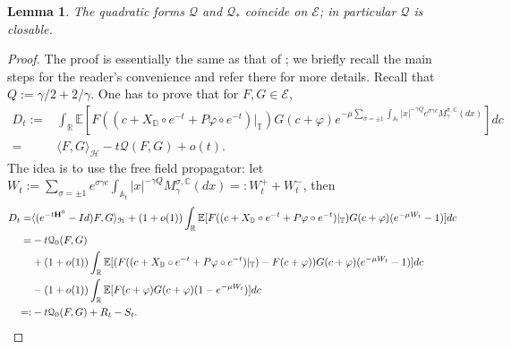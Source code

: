 \documentclass[11pt]{amsart}
\numberwithin{equation}{section}
\newtheorem{lemma}[theorem]{Lemma}
\theoremstyle{definition}
\newcommand{\C}{\mathbb{C}}
\newcommand{\A}{\mathbb{A}}
\newcommand{\R}{\mathbb{R}}
\newcommand{\cjd}{\rangle}
\newcommand{\cjg}{\langle}
\def\E{\mathbb{E}}
\newcommand{\mc}{\mathcal}
\begin{document}
 
\begin{lemma}\label{lem:Q_equal_Qstar}
The quadratic forms $\mc{Q}$ and $\mc{Q}_*$ coincide on $\mc{E}$; in particular $\mc{Q}$ is closable.
\end{lemma}
\begin{proof} The proof is essentially the same as that of \cite[Lemma 5.4]{GKRV}; we briefly recall the main steps for the reader's convenience  and refer there for more details. Recall that $Q:=\gamma/2+2/\gamma$. One has to prove that for $F,G\in \mc{E}$, 
\[\begin{split} 
D_t:=&\int_{\R} \E[ F((c+X_{\mathbb D}\circ e^{-t} +P\varphi \circ e^{-t})|_{\mathbb T})G(c+\varphi)e^{-\mu\sum_{\sigma = \pm 1}\int_{\A_t}|x|^{-\gamma Q}e^{\sigma \gamma c}M_\gamma^{\sigma,\C}(dx)}]dc\\
=&\cjg F,G\cjd_{\mc{H}}-t\mc{Q}(F,G)+o(t).
\end{split}\]
The idea is to use the free field propagator: let $W_t:=\sum_{\sigma = \pm 1}e^{\sigma \gamma c}\int_{\A_t}|x|^{-\gamma Q}M_\gamma^{\sigma,\C}(dx)=:W_t^++W_t^-$, then
\[ \begin{split}
D_t=&\cjg (e^{-t{\bf H}^0}-{\rm Id})F,G\cjd_{\mc{H}}+ (1+o(1))\int_{\R} \E[ F((c+X_{\mathbb D}\circ e^{-t} +P\varphi \circ e^{-t})|_{\mathbb T})G(c+\varphi)(e^{-\mu W_t}-1)]dc \\
=& -t\mc{Q}_0(F,G)
\\
&+(1+o(1))\int_{\R} \E[ (F((c+X_{\mathbb D}\circ e^{-t} +P\varphi \circ e^{-t})|_{\mathbb T})-F(c+\varphi))G(c+\varphi)(e^{-\mu W_t}-1)]dc\\
& - (1+o(1))\int_{\R} \E[ F(c+\varphi)G(c+\varphi)(1-e^{-\mu W_t})]dc\\
=:& -t\mc{Q}_0(F,G)+R_t-S_t.
\end{split}\]


\end{proof}
\end{document}
